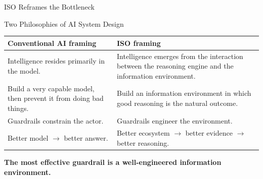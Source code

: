 \documentclass[aspectratio=169]{beamer}
\begin{document}
\begin{frame}{ISO Reframes the Bottleneck}

\begin{center}
\end{center}

\end{frame}

\begin{frame}{Two Philosophies of AI System Design}

\small

\begin{table}
\begin{tabular}{p{}p{}}
\toprule
\textbf{Conventional AI framing} & \textbf{ISO framing} \\
\midrule
Intelligence resides primarily in the model. & Intelligence emerges from the interaction between the reasoning engine and the information environment. \\
\addlinespace
Build a very capable model, then prevent it from doing bad things. & Build an information environment in which good reasoning is the natural outcome. \\
\addlinespace
Guardrails constrain the actor. & Guardrails engineer the environment. \\
\addlinespace
Better model $\rightarrow$ better answer. & Better ecosystem $\rightarrow$ better evidence $\rightarrow$ better reasoning. \\
\bottomrule
\end{tabular}
\end{table}

\vspace{0.35cm}

\begin{center}
\Large
\textbf{The most effective guardrail is a well-engineered information environment.}
\end{center}

\end{frame}
\end{document}
